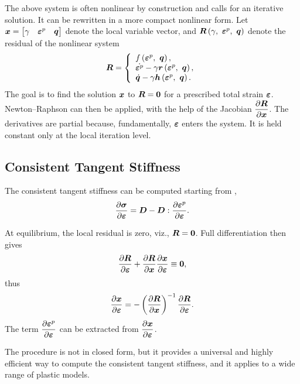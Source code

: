 The above system is often nonlinear by construction and calls for an iterative solution. It can be rewritten in a more compact nonlinear form. Let $\bm{x}=\begin{bmatrix}
\gamma&\bm{\varepsilon}^p&\bm{q}
\end{bmatrix}$ denote the local variable vector, and $\bm{R}\left(\gamma,~\bm{\varepsilon}^p,~\bm{q}\right)$ denote the residual of the nonlinear system
\begin{gather}\label{eq:local_system}
\bm{R}=\left\{
\begin{array}{l}
f\left(\bm{\varepsilon}^p,~\bm{q}\right),\\
\dot{\bm{\varepsilon}^p}-\gamma\bm{r}\left(\bm{\varepsilon}^p,~\bm{q}\right),\\
\dot{\bm{q}}-\gamma\bm{h}\left(\bm{\varepsilon}^p,~\bm{q}\right).
\end{array}\right.
\end{gather}
The goal is to find the solution $\bm{x}$ to $\bm{R}=\bm{0}$ for a prescribed total strain $\bm{\varepsilon}$.
Newton--Raphson can then be applied, with the help of the Jacobian $\dfrac{\partial{\bm{R}}}{\partial{\bm{x}}}$.
The derivatives are partial because, fundamentally, $\bm{\varepsilon}$ enters the system.
It is held constant only at the local iteration level.
\subsection{Consistent Tangent Stiffness}\label{sec:consistent_tangent_general}
The consistent tangent stiffness can be computed starting from ,
\begin{gather}
\dfrac{\partial{\bm{\sigma}}}{\partial{\bm{\varepsilon}}}=\bm{D}-\bm{D}:\dfrac{\partial{\bm{\varepsilon}^p}}{\partial{\bm{\varepsilon}}}.
\end{gather}

At equilibrium, the local residual is zero, viz., $\bm{R}=\bm{0}$.
Full differentiation then gives
\begin{gather}\label{eq:consistent_stiffness}
\dfrac{\partial{\bm{R}}}{\partial{\bm{\varepsilon}}}+\dfrac{\partial{\bm{R}}}{\partial{\bm{x}}}\dfrac{\partial{\bm{x}}}{\partial{\bm{\varepsilon}}}\equiv\bm{0},
\end{gather}
thus
\begin{gather}
\dfrac{\partial{\bm{x}}}{\partial{\bm{\varepsilon}}}=-\left(\dfrac{\partial{\bm{R}}}{\partial{\bm{x}}}\right)^{-1}\dfrac{\partial{\bm{R}}}{\partial{\bm{\varepsilon}}}.
\end{gather}
The term $\dfrac{\partial{\bm{\varepsilon}^p}}{\partial{\bm{\varepsilon}}}$ can be extracted from $\dfrac{\partial{\bm{x}}}{\partial{\bm{\varepsilon}}}$.

The procedure is not in closed form, but it provides a universal and highly efficient way to compute the consistent tangent stiffness, and it applies to a wide range of plastic models.

